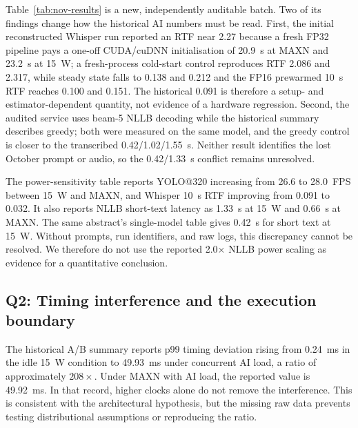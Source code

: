 \documentclass[conference]{IEEEtran}
\begin{document}
Table~\ref{tab:nov-results} is a new, independently auditable batch. Two of its findings change how the historical AI numbers must be read. First, the initial reconstructed Whisper run reported an RTF near 2.27 because a fresh FP32 pipeline pays a one-off CUDA/cuDNN initialisation of 20.9~s at MAXN and 23.2~s at 15~W; a fresh-process cold-start control reproduces RTF 2.086 and 2.317, while steady state falls to 0.138 and 0.212 and the FP16 prewarmed 10~s RTF reaches 0.100 and 0.151. The historical 0.091 is therefore a setup- and estimator-dependent quantity, not evidence of a hardware regression. Second, the audited service uses beam-5 NLLB decoding while the historical summary describes greedy; both were measured on the same model, and the greedy control is closer to the transcribed 0.42/1.02/1.55~s. Neither result identifies the lost October prompt or audio, so the 0.42/1.33~s conflict remains unresolved.

The power-sensitivity table reports YOLO@320 increasing from 26.6 to 28.0~FPS between 15~W and MAXN, and Whisper 10~s RTF improving from 0.091 to 0.032. It also reports NLLB short-text latency as 1.33~s at 15~W and 0.66~s at MAXN. The same abstract's single-model table gives 0.42~s for short text at 15~W. Without prompts, run identifiers, and raw logs, this discrepancy cannot be resolved. We therefore do not use the reported 2.0$\times$ NLLB power scaling as evidence for a quantitative conclusion.

\subsection{Q2: Timing interference and the execution boundary}
The historical A/B summary reports p99 timing deviation rising from 0.24~ms in the idle 15~W condition to 49.93~ms under concurrent AI load, a ratio of approximately $208\times$. Under MAXN with AI load, the reported value is 49.92~ms. In that record, higher clocks alone do not remove the interference. This is consistent with the architectural hypothesis, but the missing raw data prevents testing distributional assumptions or reproducing the ratio.
\end{document}
